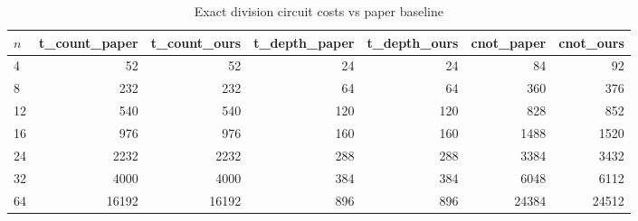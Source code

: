 \begin{table}[ht]
\centering
\small
\begin{tabular}{lrrrrrr}
\toprule
$n$ & t_count_paper & t_count_ours & t_depth_paper & t_depth_ours & cnot_paper & cnot_ours \\
\midrule
4 & 52 & 52 & 24 & 24 & 84 & 92 \\
8 & 232 & 232 & 64 & 64 & 360 & 376 \\
12 & 540 & 540 & 120 & 120 & 828 & 852 \\
16 & 976 & 976 & 160 & 160 & 1488 & 1520 \\
24 & 2232 & 2232 & 288 & 288 & 3384 & 3432 \\
32 & 4000 & 4000 & 384 & 384 & 6048 & 6112 \\
64 & 16192 & 16192 & 896 & 896 & 24384 & 24512 \\
\bottomrule
\end{tabular}
\caption{Exact division circuit costs vs paper baseline}
\label{tab:baseline}
\end{table}